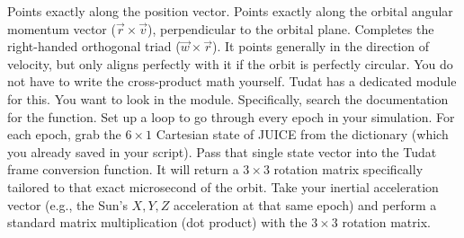{}\markdownRendererUlBegin
\markdownRendererUlItem {} Points exactly along the position vector.\markdownRendererUlItemEnd 
\markdownRendererUlItem {} Points exactly along the orbital angular momentum vector ($\vec{r} \times \vec{v}$), perpendicular to the orbital plane.\markdownRendererUlItemEnd 
\markdownRendererUlItem {} Completes the right-handed orthogonal triad ($\vec{w} \times \vec{r}$). It points generally in the direction of velocity, but only aligns perfectly with it if the orbit is perfectly circular.\markdownRendererUlItemEnd 
\markdownRendererUlEnd \markdownRendererInterblockSeparator
{}
\markdownRendererSectionEnd \markdownRendererSectionBegin
{}\markdownRendererInterblockSeparator
{}You do not have to write the cross-product math yourself. Tudat has a dedicated module for this.\markdownRendererInterblockSeparator
{} You want to look in the  module. Specifically, search the documentation for the  function.\markdownRendererInterblockSeparator
{}\markdownRendererInterblockSeparator
{}\markdownRendererOlBegin
{} Set up a loop to go through every epoch in your simulation.\markdownRendererOlItemEnd 
{} For each epoch, grab the $6 \times 1$ Cartesian state of JUICE from the  dictionary (which you already saved in your script).\markdownRendererOlItemEnd 
{} Pass that single state vector into the Tudat frame conversion function. It will return a $3 \times 3$ rotation matrix specifically tailored to that exact microsecond of the orbit.\markdownRendererOlItemEnd 
{} Take your inertial acceleration vector (e.g., the Sun's $X, Y, Z$ acceleration at that same epoch) and perform a standard matrix multiplication (dot product) with the $3 \times 3$ rotation matrix.\markdownRendererOlItemEnd 
